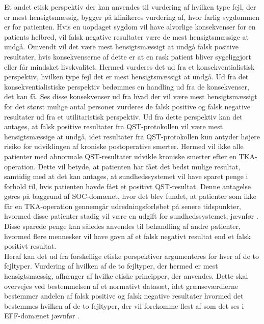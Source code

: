 Et andet etisk perspektiv der kan anvendes til vurdering af hvilken type fejl, der er mest hensigtsmæssig, bygger på klinikeres vurdering af, hvor farlig sygdommen er for patienten. Hvis en uopdaget sygdom vil have alvorlige konsekvenser for en patients helbred, vil falsk negative resultater være de mest hensigtsmæssige at undgå. Omvendt vil det være mest hensigtsmæssigt at undgå falsk positive resultater, hvis konsekvenserne af dette er at en rask patient bliver sygeliggjort eller får mindsket livskvalitet. \citep{Kraemer2011} Hermed vurderes det ud fra et konsekventialistisk perspektiv, hvilken type fejl det er mest hensigtsmæssigt at undgå. Ud fra det konsekventialistiske perspektiv bedømmes en handling ud fra de konsekvenser, det kan få. Ses disse konsekvenser ud fra hvad der vil være mest hensigtsmæssigt for det størst mulige antal personer vurderes de falsk positive og falsk negative resultater ud fra et utilitaristisk perspektiv. \citep{Kraemer2011} Ud fra dette perspektiv kan det antages, at falsk positive resultater fra QST-protokollen vil være mest hensigtsmæssige at undgå, idet resultater fra QST-protokollen kun antyder højere risiko for udviklingen af kroniske postoperative smerter. Hermed vil ikke alle patienter med abnormale QST-resultater udvikle kroniske smerter efter en TKA-operation. Dette vil betyde, at patienten har fået det bedst mulige resultat, samtidig med at det kan antages, at sundhedssystemet vil have sparet penge i forhold til, hvis patienten havde fået et positivt QST-resultat. Denne antagelse gøres på baggrund af SOC-domænet, hvor det blev fundet, at patienter som ikke får en TKA-operation gennemgår udredningsforløbet på senere tidspunkter, hvormed disse patienter stadig vil være en udgift for sundhedssystemet, jævnfør . Disse sparede penge kan således anvendes til behandling af andre patienter, hvormed flere mennesker vil have gavn af et falsk negativt resultat end et falsk positivt resultat. \\
Heraf kan det ud fra forskellige etiske perspektiver argumenteres for hver af de to fejltyper. Vurdering af hvilken af de to fejltyper, der hermed er mest hensigtsmæssig, afhænger af hvilke etiske principper, der anvendes. Dette skal overvejes ved bestemmelsen af et normativt datasæt, idet grænseværdierne bestemmer andelen af falsk positive og falsk negative resultater hvormed det bestemmes hvilken af de to fejltyper, der vil forekomme flest af som det ses i EFF-domænet jævnfør .  

